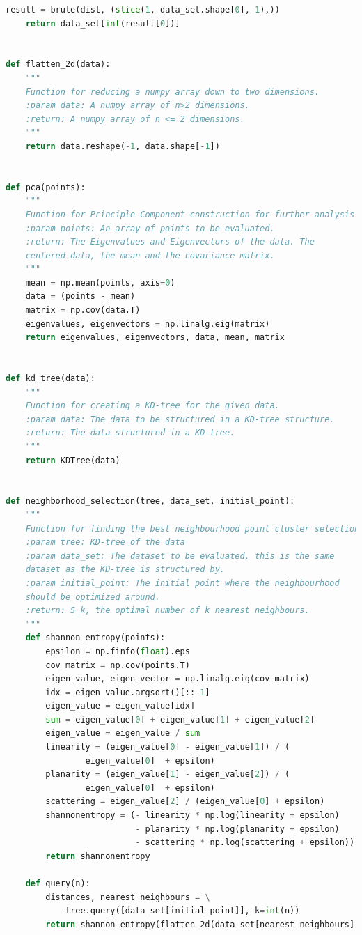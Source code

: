 \documentclass[%
]{USN-MSc}
\begin{document}
\begin{lstlisting}[language=Python, caption=Methods implemented in code, label={lst:Methods}]
    result = brute(dist, (slice(1, data_set.shape[0], 1),))
    return data_set[int(result[0])]


def flatten_2d(data):
    """
    Function for reducing a numpy array down to two dimensions.
    :param data: A numpy array of n>2 dimensions.
    :return: A numpy array of n <= 2 dimensions.
    """
    return data.reshape(-1, data.shape[-1])


def pca(points):
    """
    Function for Principle Component construction for further analysis.
    :param points: An array of points to be evaluated.
    :return: The Eigenvalues and Eigenvectors of the data. The
    centered data, the mean and the covariance matrix.
    """
    mean = np.mean(points, axis=0)
    data = (points - mean)
    matrix = np.cov(data.T)
    eigenvalues, eigenvectors = np.linalg.eig(matrix)
    return eigenvalues, eigenvectors, data, mean, matrix


def kd_tree(data):
    """
    Function for creating a KD-tree for the given data.
    :param data: The data to be structured in a KD-tree structure.
    :return: The data structured in a KD-tree.
    """
    return KDTree(data)


def neighborhood_selection(tree, data_set, initial_point):
    """
    Function for finding the best neighbourhood point cluster selection.
    :param tree: KD-tree of the data
    :param data_set: The dataset to be evaluated, this is the same  
    dataset as the KD-tree is structured by.
    :param initial_point: The initial point where the neighbourhood 
    should be optimized around.
    :return: S_k, the optimal number of k nearest neighbours.
    """
    def shannon_entropy(points):
        epsilon = np.finfo(float).eps
        cov_matrix = np.cov(points.T)
        eigen_value, eigen_vector = np.linalg.eig(cov_matrix)
        idx = eigen_value.argsort()[::-1]
        eigen_value = eigen_value[idx]
        sum = eigen_value[0] + eigen_value[1] + eigen_value[2]
        eigen_value = eigen_value / sum
        linearity = (eigen_value[0] - eigen_value[1]) / (
                eigen_value[0]  + epsilon)
        planarity = (eigen_value[1] - eigen_value[2]) / (
                eigen_value[0]  + epsilon)
        scattering = eigen_value[2] / (eigen_value[0] + epsilon)
        shannonentropy = (- linearity * np.log(linearity + epsilon)
                          - planarity * np.log(planarity + epsilon)
                          - scattering * np.log(scattering + epsilon))
        return shannonentropy

    def query(n):
        distances, nearest_neighbours = \
            tree.query([data_set[initial_point]], k=int(n))
        return shannon_entropy(flatten_2d(data_set[nearest_neighbours]))


\end{lstlisting}
\end{document}
